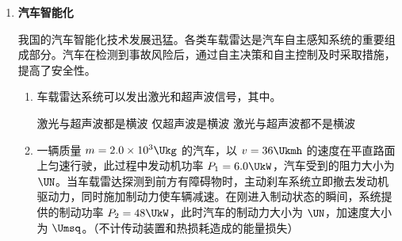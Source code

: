 \documentclass[\gkver]{gaokaozhenti}
\begin{document}
\begin{enumerate}
{2．（1）此过程是等压变化，根据盖-吕萨克定律，$\frac{V}{T}$ 为一常量，在 $V-T$ 图像中为一条过原点的倾斜直线。

（2）此实验压强保持不变，测量的是气体的温度和体积，因此无需记录大气压强，选项 B 错误；此实验是通过测量水温间接获得气体的温度，因此无需记录环境温度，选项 A 错误；但需要将封闭气体完全浸没在水中，选项 D 正确；此过程气体温度、体积一直在发生变化，无法等待温度读数稳定，选项 C 错误。
}

\item
\textbf{汽车智能化}

我国的汽车智能化技术发展迅猛。各类车载雷达是汽车自主感知系统的重要组成部分。汽车在检测到事故风险后，通过自主决策和自主控制及时采取措施，提高了安全性。
\begin{enumerate}
	\item
	车载雷达系统可以发出激光和超声波信号，其中。

	{激光与超声波都是横波}
	{仅超声波是横波}
	{激光与超声波都不是横波}

	\item
	一辆质量 $m = 2.0\times10^{3} \Ukg$ 的汽车，以 $v = 36 \Ukmh$ 的速度在平直路面上匀速行驶，此过程中发动机功率 $P_{1} = 6.0 \UkW$，汽车受到的阻力大小为 $\UN$。当车载雷达探测到前方有障碍物时，主动刹车系统立即撤去发动机驱动力，同时施加制动力使车辆减速。在刚进入制动状态的瞬间，系统提供的制动功率 $P_{2} = 48 \UkW$，此时汽车的制动力大小为 $\UN$，加速度大小为 $\Umsq$。（不计传动装置和热损耗造成的能量损失）
\end{enumerate}


\end{enumerate}
\end{document}
